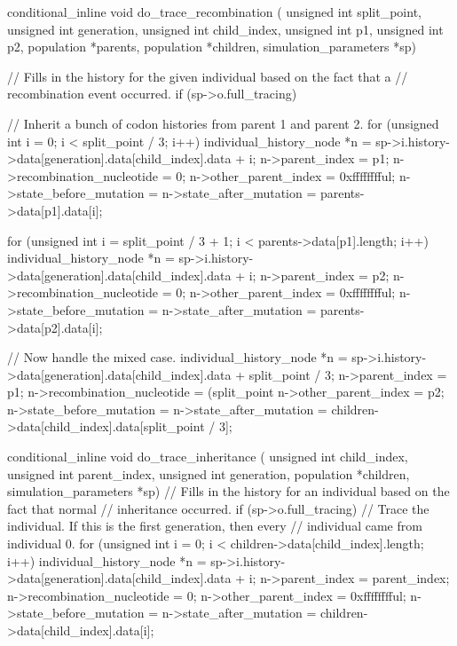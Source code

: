 \documentclass{article}
\begin{document}
\begin{ccode}
conditional_inline void do_trace_recombination (
    unsigned int split_point, unsigned int generation,
    unsigned int child_index, unsigned int p1, unsigned int p2,
    population *parents, population *children, simulation_parameters *sp) {
  // Fills in the history for the given individual based on the fact that a
  // recombination event occurred.
  if (sp->o.full_tracing) {
    // Inherit a bunch of codon histories from parent 1 and parent 2.
    for (unsigned int i = 0; i < split_point / 3; i++) {
      individual_history_node *n =
        sp->i.history->data[generation].data[child_index].data + i;
      n->parent_index = p1;
      n->recombination_nucleotide = 0;
      n->other_parent_index = 0xfffffffful;
      n->state_before_mutation = n->state_after_mutation =
        parents->data[p1].data[i];
    }

    for (unsigned int i = split_point / 3 + 1; i < parents->data[p1].length; i++) {
      individual_history_node *n =
        sp->i.history->data[generation].data[child_index].data + i;
      n->parent_index = p2;
      n->recombination_nucleotide = 0;
      n->other_parent_index = 0xfffffffful;
      n->state_before_mutation = n->state_after_mutation =
        parents->data[p2].data[i];
    }

    // Now handle the mixed case.
    individual_history_node *n =
      sp->i.history->data[generation].data[child_index].data + split_point / 3;
    n->parent_index = p1;
    n->recombination_nucleotide = (split_point %
    n->other_parent_index = p2;
    n->state_before_mutation = n->state_after_mutation =
      children->data[child_index].data[split_point / 3];
  }
}

conditional_inline void do_trace_inheritance (
    unsigned int child_index, unsigned int parent_index,
    unsigned int generation, population *children, simulation_parameters *sp) {
  // Fills in the history for an individual based on the fact that normal
  // inheritance occurred.
  if (sp->o.full_tracing)
    // Trace the individual. If this is the first generation, then every
    // individual came from individual 0.
    for (unsigned int i = 0; i < children->data[child_index].length; i++) {
      individual_history_node *n = sp->i.history->data[generation].data[child_index].data + i;
      n->parent_index = parent_index;
      n->recombination_nucleotide = 0;
      n->other_parent_index = 0xfffffffful;
      n->state_before_mutation = n->state_after_mutation =
       children->data[child_index].data[i];
    }
}


\end{ccode}
\end{document}
